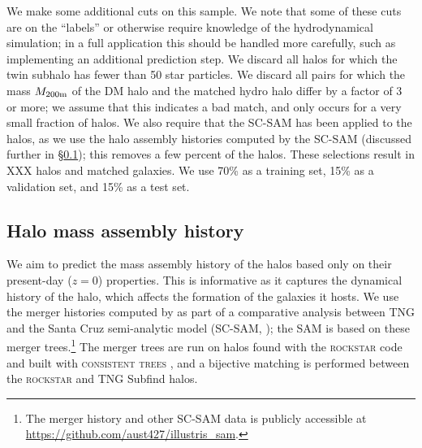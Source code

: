 We make some additional cuts on this sample.
We note that some of these cuts are on the ``labels'' or otherwise require knowledge of the hydrodynamical simulation; in a full application this should be handled more carefully, such as implementing an additional prediction step. 
We discard all \dark halos for which the twin \hydro subhalo has fewer than 50 star particles.
We discard all pairs for which the mass $M_\mathrm{200m}$ of the DM halo and the matched hydro halo differ by a factor of 3 or more; we assume that this indicates a bad match, and only occurs for a very small fraction of halos.
We also require that the SC-SAM has been applied to the halos, as we use the halo assembly histories computed by the SC-SAM (discussed further in \S\ref{sec:mah}); this removes a few percent of the halos.
These selections result in XXX \dark halos and matched \hydro galaxies.
We use 70\% as a training set, 15\% as a validation set, and 15\% as a test set.


\subsection{Halo mass assembly history}
\label{sec:mah}

We aim to predict the mass assembly history of the \dark halos based only on their present-day ($z=0$) properties.
This is informative as it captures the dynamical history of the halo, which affects the formation of the galaxies it hosts.
We use the merger histories computed by \citep{gabrielpillai_galaxy_2021} as part of a comparative analysis between TNG and the Santa Cruz semi-analytic model (SC-SAM, \citealt{somerville_semi-analytic_1999,somerville_semi-analytic_2008, somerville_star_2015}); the SAM is based on these merger trees.\footnote{The merger history and other SC-SAM data is publicly accessible at \url{https://github.com/aust427/illustris_sam}.}
The merger trees are run on halos found with the \textsc{rockstar} \citep{behroozi_rockstar_2013} code and built with \textsc{consistent trees} \citep{behroozi_gravitationally_2012}, and a bijective matching is performed between the \textsc{rockstar} and TNG Subfind halos.

